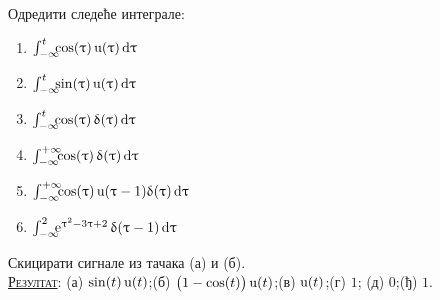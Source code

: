 \noindent
\PID Одредити следеће интеграле: 
\begin{multicols}{3}
\begin{enumerate}[label=(\alph*)]
\item $\int_{-\infty}^t \hspace*{-0.5em}
\cos (\uptau)\,{\rm u}(\uptau)\,{\rm d}\uptau$
\item $\int_{-\infty}^t \hspace*{-0.5em}
\sin (\uptau)\,{\rm u}(\uptau)\,{\rm d}\uptau$
\item $\int_{-\infty}^t \hspace*{-0.5em}
\cos (\uptau)\,\updelta(\uptau)\,{\rm d}\uptau$
\item $\int_{-\infty}^{+\infty} \hspace*{-0.5em}
\cos (\uptau)\,\updelta(\uptau)\,{\rm d}\uptau$
\item $\int_{-\infty}^{+\infty} \hspace*{-0.5em}
\cos (\uptau)\,{\rm u}(\uptau-1)\updelta(\uptau)\,{\rm d}\uptau$
\item $\int_{-\infty}^{2}
 \hspace*{-0.5em}
{\rm e}^{\uptau^2 - 3\uptau + 2} \, \updelta(\uptau-1) \,{\rm d}\uptau$
\end{enumerate}
\end{multicols}
\noindent
Скицирати сигнале из тачака (а) и (б).
\\[2mm]

\textsc{\underline{Резултат}}:
(а) $\sin(t)\,{\rm u}(t)$;\hfill (б) $\bigl(1 - \cos(t)\bigr)\,{\rm u}(t)$;\hfill (в) ${\rm u}(t)$;\hfill (г) $1$;\hfill 
(д) $0$;\hfill (ђ) $1$.
